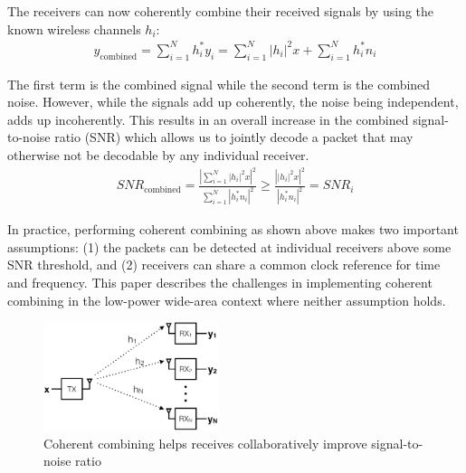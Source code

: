 

The receivers can now coherently combine their received signals by using the known wireless channels $h_i$:
\begin{align*}
y_{\text{combined}}
	= \sum_{i=1}^N h^*_i y_i
	= \sum_{i=1}^N \left| h_i \right|^2 x + \sum_{i=1}^N h^*_i n_i
\end{align*}

The first term is the combined signal while the second term is the combined
noise. However, while the signals add up coherently, the noise being
independent, adds up incoherently.  This results in an overall increase in the
combined signal-to-noise ratio (SNR) which allows us to jointly decode a packet that may otherwise not be decodable by any individual receiver.
\begin{align*}
SNR_{\text{combined}} %
	= \frac{\left| \sum_{i=1}^N \left| h_i \right|^2 x \right|^2}{\sum_{i=1}^N \left| h^*_i n_i \right|^2} 
	\geq \frac{\left| \left| h_i \right|^2 x \right|^2}{\left| h^*_i n_i \right|^2} = SNR_i
\end{align*}

In practice, performing coherent combining as shown above makes two important assumptions: (1) the packets can be detected at individual receivers above some SNR threshold, and (2) receivers can share a common clock reference for time and frequency. This paper describes the challenges in implementing coherent combining in the low-power wide-area context where neither assumption holds. 

\begin{figure}[htb]
    \centering
    \includegraphics[height=1.25in]{figures/SIMO_cropped}
    \caption{Coherent combining helps receives collaboratively improve signal-to-noise ratio}
    \label{fig:simo}
\end{figure}

